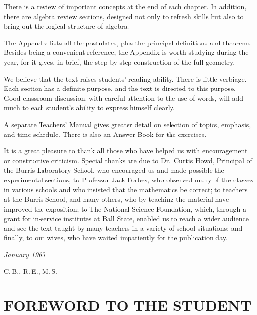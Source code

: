 \documentclass[11pt]{book}
\theoremstyle{bkplain}
\theoremstyle{XIplainnote}
\theoremstyle{bkplain}
\theoremstyle{bkplain}
\begin{document}
There is a review of important concepts at the end of each chapter. In addition,
there are algebra review sections, designed not only to refresh skills but also
to bring out the logical structure of algebra.

The Appendix lists all the postulates, plus the principal definitions and
theorems. Besides being a convenient reference, the Appendix is worth studying
during the year, for it gives, in brief, the step-by-step construction of the
full geometry.

We believe that the text raises students' reading ability. There is little
verbiage. Each section has a definite purpose, and the text is directed to this
purpose. Good classroom discussion, with careful attention to the use of words,
will add much to each student's ability to express himself clearly.

A separate Teachers' Manual gives greater detail on selection of topics,
emphasis, and time schedule. There is also an Answer Book for the exercises.

It is a great pleasure to thank all those who have helped us with encouragement
or constructive criticism. Special thanks are due to Dr.\ Curtis Howd, Principal
of the Burris Laboratory School, who encouraged us and made possible the
experimental sections; to Professor Jack Forbes, who observed many of the
classes in various schools and who insisted that the mathematics be correct; to
teachers at the Burris School, and many others, who by teaching the material
have improved the exposition; to The National Science Foundation, which, through
a grant for in-service institutes at Ball State, enabled us to reach a wider
audience and see the text taught by many teachers in a variety of school
situations; and finally, to our wives, who have waited impatiently for the
publication day.

\vspace{1.2em}
\noindent
\begin{minipage}[t]{0.45\linewidth}
\itshape January 1960
\end{minipage}\hfill
\begin{minipage}[t]{0.45\linewidth}
\raggedleft C.\,B., R.\,E., M.\,S.
\end{minipage}

\chapter*{\centering\Large FOREWORD TO THE STUDENT}
\end{document}
